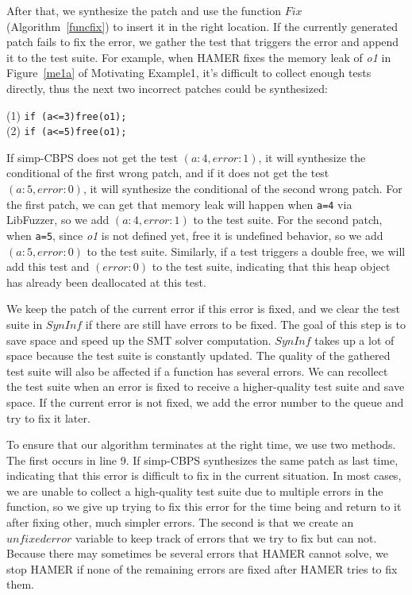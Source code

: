 \documentclass[a4paper,11pt,oneside,openany]{book}
\begin{document}
After that, we synthesize the patch and use the function $Fix$ (Algorithm~\ref{funcfix}) to insert it in the right location. If the currently generated patch fails to fix the error, we gather the test that triggers the error and append it to the test suite. For example, when HAMER fixes the memory leak of {\it o1} in Figure~\ref{me1a} of Motivating Example1, it's difficult to collect enough tests directly, thus the next two incorrect patches could be synthesized:


\begin{minipage}{\textwidth}
    \vspace{0.2cm}
    \hspace{0.3cm}(1) \verb|if (a<=3)free(o1);|\\\hspace{0.3cm}(2) \verb|if (a<=5)free(o1);|
\end{minipage}
If simp-CBPS does not get the test $(a:4, error:1)$, it will synthesize the conditional of the first wrong patch, and if it does not get the test $(a:5, error:0)$, it will synthesize the conditional of the second wrong patch. For the first patch, we can get that memory leak will happen when \verb|a=4| via LibFuzzer, so we add $(a:4, error:1)$ to the test suite. For the second patch, when \verb|a=5|, since {\it o1} is not defined yet, free it is undefined behavior, so we add $(a:5, error:0)$ to the test suite. Similarly, if a test triggers a double free, we will add this test and $(error:0)$ to the test suite, indicating that this heap object has already been deallocated at this test.


We keep the patch of the current error if this error is fixed, and we clear the test suite in $SynInf$ if there are still have errors to be fixed. The goal of this step is to save space and speed up the SMT solver computation. $SynInf$ takes up a lot of space because the test suite is constantly updated. The quality of the gathered test suite will also be affected if a function has several errors. We can recollect the test suite when an error is fixed to receive a higher-quality test suite and save space. If the current error is not fixed, we add the error number to the queue and try to fix it later.



To ensure that our algorithm terminates at the right time, we use two methods. The first occurs in line 9. If simp-CBPS synthesizes the same patch as last time, indicating that this error is difficult to fix in the current situation. In most cases, we are unable to collect a high-quality test suite due to multiple errors in the function, so we give up trying to fix this error for the time being and return to it after fixing other, much simpler errors. The second is that we create an $unfixederror$ variable to keep track of errors that we try to fix but can not. Because there may sometimes be several errors that HAMER cannot solve, we stop HAMER if none of the remaining errors are fixed after HAMER tries to fix them.
\end{document}
